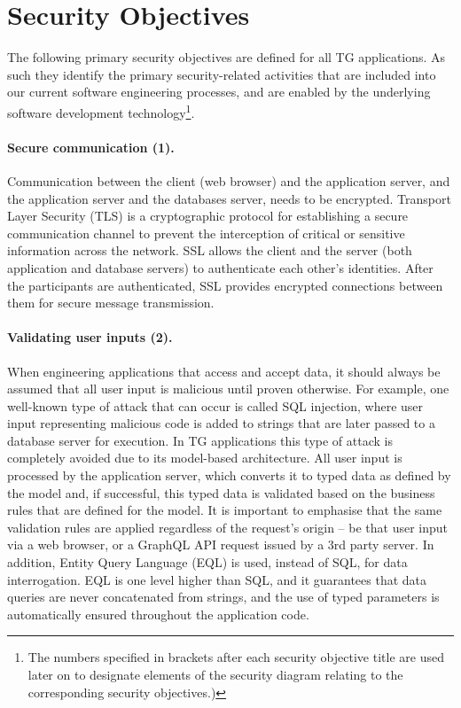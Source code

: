 \documentclass[a4paper,12pt,oneside,openright]{memoir}
\begin{document}
\section*{Security Objectives}\label{sec:01}

	The following primary security objectives are defined for all TG applications.
	As such they identify the primary security-related activities that are included into our current software engineering processes, and are enabled by the underlying software development technology\footnote{The numbers specified in brackets after each security objective title are used later on to designate elements of the security diagram relating to the corresponding security objectives.)}.

	\paragraph{Secure communication (1).}
	    Communication between the client (web browser) and the application server, and the application server and the databases server, needs to be encrypted.
		Transport Layer Security (TLS) is a cryptographic protocol for establishing a secure communication channel to prevent the interception of critical or sensitive information across the network.
		SSL allows the client and the server (both application and database servers) to authenticate each other's identities.
		After the participants are authenticated, SSL provides encrypted connections between them for secure message transmission.

	\paragraph{Validating user inputs (2).}
		When engineering applications that access and accept data, it should always be assumed that all user input is malicious until proven otherwise.
		For example, one well-known type of attack that can occur is called SQL injection, where user input representing malicious code is added to strings that are later passed to a database server for execution.
		In TG applications this type of attack is completely avoided due to its model-based architecture.
		All user input is processed by the application server, which converts it to typed data as defined by the model and, if successful, this typed data is validated based on the business rules that are defined for the model.
		It is important to emphasise that the same validation rules are applied regardless of the request's origin -- be that user input via a web browser, or a GraphQL API request issued by a 3rd party server.
		In addition, Entity Query Language (EQL) is used, instead of SQL, for data interrogation.
		EQL is one level higher than SQL, and it guarantees that data queries are never concatenated from strings, and the use of typed parameters is automatically ensured throughout the application code.
\end{document}
